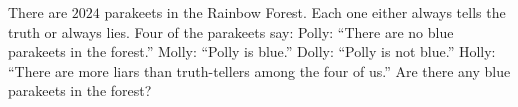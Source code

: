 There are $2024$ parakeets in the Rainbow Forest. Each one either always tells the truth or always lies. Four of the parakeets say: Polly: ``There are no blue parakeets in the forest.'' Molly: ``Polly is blue.'' Dolly: ``Polly is not blue.'' Holly: ``There are more liars than truth-tellers among the four of us.'' Are there any blue parakeets in the forest?

